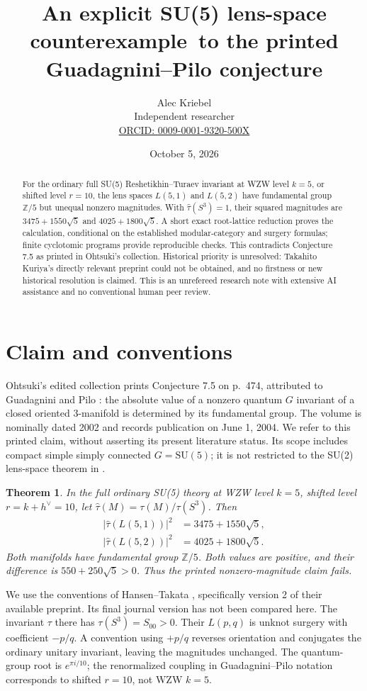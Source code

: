 \documentclass[11pt]{article}
\title{An explicit SU(5) lens-space counterexample\ to the printed Guadagnini--Pilo conjecture}
\author{Alec Kriebel\\Independent researcher\\\small\href{https://orcid.org/0009-0001-9320-500X}{ORCID: 0009-0001-9320-500X}}
\date{October 5, 2026}
\newtheorem{theorem}{Theorem}
\newcommand{\Z}{\mathbb Z}
\newcommand{\wt}{\widehat\tau}
\begin{document}
\maketitle
\begin{abstract}
For the ordinary full SU(5) Reshetikhin--Turaev invariant at WZW level
$k=5$, or shifted level $r=10$, the lens spaces $L(5,1)$ and $L(5,2)$
have fundamental group $\Z/5$ but unequal nonzero magnitudes. With
$\wt(S^3)=1$, their squared magnitudes are $3475+1550\sqrt5$ and
$4025+1800\sqrt5$. A short exact root-lattice reduction proves the
calculation, conditional on the established modular-category and surgery
formulas; finite cyclotomic programs provide reproducible checks.
This contradicts Conjecture 7.5 as printed in Ohtsuki's collection.
Historical priority is unresolved: Takahito Kuriya's directly relevant
preprint could not be obtained, and no firstness or new historical
resolution is claimed. This is an unrefereed research note with extensive
AI assistance and no conventional human peer review.
\end{abstract}

\section{Claim and conventions}
Ohtsuki's edited collection \cite{O} prints Conjecture 7.5 on p.~474,
attributed to Guadagnini and Pilo \cite{GP}: the absolute value of a
nonzero quantum $G$ invariant of a closed oriented 3-manifold is
determined by its fundamental group. The volume is nominally dated 2002
and records publication on June 1, 2004. We refer to this printed claim,
without asserting its present literature status. Its scope includes
compact simple simply connected $G=\mathrm{SU}(5)$; it is not restricted
to the SU(2) lens-space theorem in \cite{GP}.

\begin{theorem}
In the full ordinary SU(5) theory at WZW level $k=5$, shifted level
$r=k+h^\vee=10$, let $\wt(M)=\tau(M)/\tau(S^3)$. Then
\begin{align}
 |\wt(L(5,1))|^2&=3475+1550\sqrt5,\label{eq:one}\\
 |\wt(L(5,2))|^2&=4025+1800\sqrt5.\label{eq:two}
\end{align}
Both manifolds have fundamental group $\Z/5$. Both values are positive,
and their difference is $550+250\sqrt5>0$. Thus the printed nonzero-magnitude
claim fails.
\end{theorem}

We use the conventions of Hansen--Takata \cite{HT}, specifically version 2
of their available preprint. Its final journal version has not
been compared here. The invariant $\tau$ there has $\tau(S^3)=S_{00}>0$.
Their $L(p,q)$ is unknot surgery with coefficient $-p/q$. A convention
using $+p/q$ reverses orientation and conjugates the ordinary unitary
invariant, leaving the magnitudes unchanged. The quantum-group root is
$e^{\pi i/10}$; the renormalized coupling in Guadagnini--Pilo notation
corresponds to shifted $r=10$, not WZW $k=5$.
\end{document}
